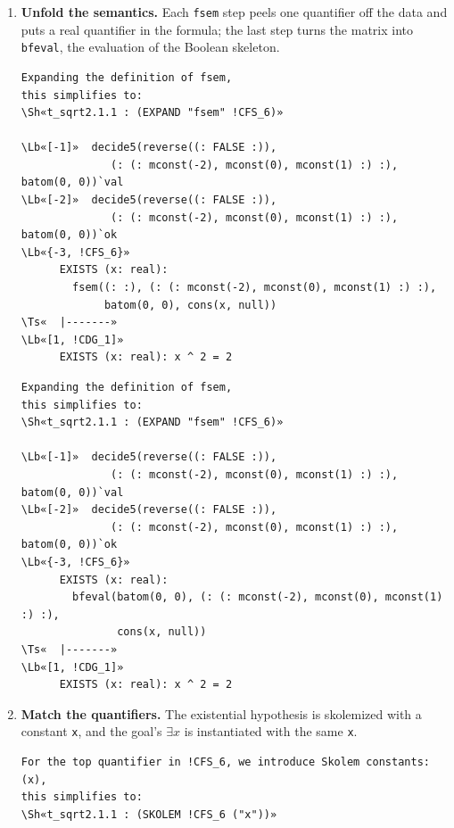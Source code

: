 \documentclass[11pt]{article}
\newcommand\Lb[1]{\textcolor{muted}{#1}}
\newcommand\Ts[1]{\textcolor{muted}{#1}}
\newcommand\Sh[1]{\textcolor{accent}{#1}}
\begin{document}
\begin{enumerate}[leftmargin=1.4em, itemsep=10pt, label=\textbf{\textcolor{accent}{\arabic*}}]
\item \textbf{Unfold the semantics.} Each \texttt{fsem} step peels one quantifier off the data and puts a real quantifier in the formula;
the last step turns the matrix into \texttt{bfeval}, the evaluation of the Boolean skeleton.
\begin{termbox}
\begin{Verbatim}[commandchars=\\«»]
Expanding the definition of fsem,
this simplifies to:
\Sh«t_sqrt2.1.1 : (EXPAND "fsem" !CFS_6)»

\Lb«[-1]»  decide5(reverse((: FALSE :)),
              (: (: mconst(-2), mconst(0), mconst(1) :) :), batom(0, 0))`val
\Lb«[-2]»  decide5(reverse((: FALSE :)),
              (: (: mconst(-2), mconst(0), mconst(1) :) :), batom(0, 0))`ok
\Lb«{-3, !CFS_6}»
      EXISTS (x: real):
        fsem((: :), (: (: mconst(-2), mconst(0), mconst(1) :) :),
             batom(0, 0), cons(x, null))
\Ts«  |-------»
\Lb«[1, !CDG_1]»
      EXISTS (x: real): x ^ 2 = 2
\end{Verbatim}
\end{termbox}
\begin{termbox}
\begin{Verbatim}[commandchars=\\«»]
Expanding the definition of fsem,
this simplifies to:
\Sh«t_sqrt2.1.1 : (EXPAND "fsem" !CFS_6)»

\Lb«[-1]»  decide5(reverse((: FALSE :)),
              (: (: mconst(-2), mconst(0), mconst(1) :) :), batom(0, 0))`val
\Lb«[-2]»  decide5(reverse((: FALSE :)),
              (: (: mconst(-2), mconst(0), mconst(1) :) :), batom(0, 0))`ok
\Lb«{-3, !CFS_6}»
      EXISTS (x: real):
        bfeval(batom(0, 0), (: (: mconst(-2), mconst(0), mconst(1) :) :),
               cons(x, null))
\Ts«  |-------»
\Lb«[1, !CDG_1]»
      EXISTS (x: real): x ^ 2 = 2
\end{Verbatim}
\end{termbox}

\item \textbf{Match the quantifiers.} The existential hypothesis is skolemized with a constant \texttt{x}, and the goal's
$\exists x$ is instantiated with the same \texttt{x}.
\begin{termbox}
\begin{Verbatim}[commandchars=\\«»]
For the top quantifier in !CFS_6, we introduce Skolem constants: (x),
this simplifies to:
\Sh«t_sqrt2.1.1 : (SKOLEM !CFS_6 ("x"))»


\end{Verbatim}
\end{termbox}
\end{enumerate}
\end{document}
